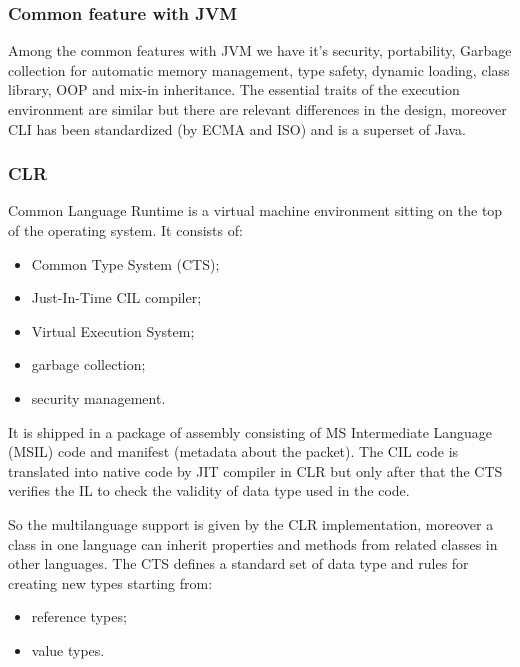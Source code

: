 \subsubsection{Common feature with JVM}
Among the common features with JVM we have it's security, portability, Garbage collection for automatic memory management, type safety, dynamic loading, class library, OOP and mix-in inheritance.
The essential traits of the execution environment are similar but there are relevant differences in the design, moreover CLI has been standardized (by ECMA and ISO) and is a superset of Java.

\subsubsection{CLR}
Common Language Runtime is a virtual machine environment sitting on the top of the operating system.
It consists of:
\begin{itemize}
    \item Common Type System (CTS);
    \item Just-In-Time CIL compiler;
    \item Virtual Execution System;
    \item garbage collection;
    \item security management.
\end{itemize}
It is shipped in a package of assembly consisting of MS Intermediate Language (MSIL) code and manifest (metadata about the packet).
The CIL code is translated into native code by JIT compiler in CLR but only after that the CTS verifies the IL to check the validity of data type used in the code.

So the multilanguage support is given by the CLR implementation, moreover a class in one language can inherit properties and methods from related classes in other languages.
The CTS defines a standard set of data type and rules for creating new types starting from:
\begin{itemize}
    \item reference types;
    \item value types.
\end{itemize}

